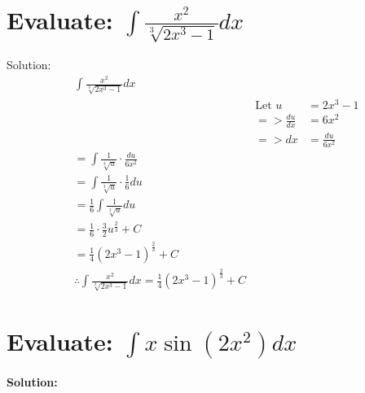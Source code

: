 \documentclass{article}
\begin{document}
\section{Evaluate: $\int \frac{x^2}{\sqrt[3]{2x^3-1}} dx $}
Solution:
\begin{align*}
     & \int \frac{x^2}{\sqrt[3]{2x^3-1}} dx                                                                                              \\
     &                                                                                            & \text{Let } u    & = 2x^3 - 1        \\
     &                                                                                            & => \frac{du}{dx} & = 6x^2            \\
     &                                                                                            & => dx            & = \frac{du}{6x^2} \\
     & = \int \frac{1}{\sqrt[3]{u}} \cdot \frac{du}{6x^2}                                                                                \\
     & = \int \frac{1}{\sqrt[3]{u}} \cdot \frac{1}{6} du                                                                                 \\
     & = \frac{1}{6} \int \frac{1}{\sqrt[3]{u}} du                                                                                       \\
     & = \frac{1}{6} \cdot \frac{3}{2} u^{\frac{2}{3}} + C                                                                               \\
     & = \frac{1}{4} (2x^3 - 1)^{\frac{2}{3}} + C                                                                                        \\
     & \therefore \int \frac{x^2}{\sqrt[3]{2x^3-1}} dx = \frac{1}{4} (2x^3 - 1)^{\frac{2}{3}} + C
\end{align*}

\newpage
\section{Evaluate: $\int x \sin(2x^2) dx$}

\textbf{Solution:}
\end{document}
